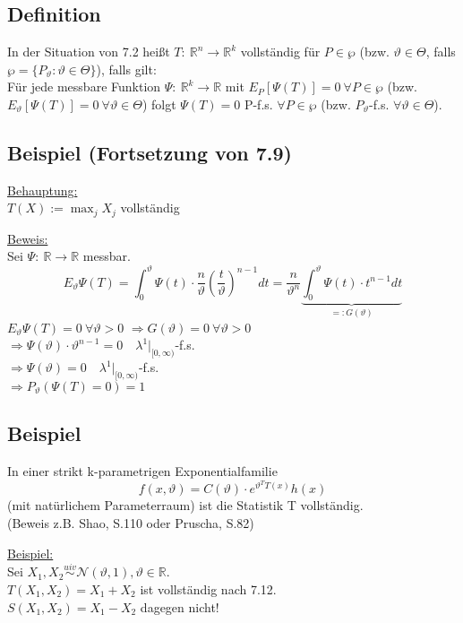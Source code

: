\documentclass[a4paper,11pt,twoside,titlepage]{article}
\newcommand{\R}{{\mathbb R}}
\newcommand\NN{ \mathcal{N} } %
\newcommand{\uiv}{\ensuremath{\stackrel{uiv}{\sim}}}
\begin{document}
\subsection{Definition}
In der Situation von 7.2 heißt $T:\ \R^n\to\R^k$ vollständig für $P\in\wp$ (bzw. $\vartheta\in\Theta$, falls $\wp=\{P_\vartheta:\vartheta\in\Theta\}$), falls gilt:\\
Für jede messbare Funktion $\Psi:\ \R^k\to\R$ mit $E_P[\Psi(T)]=0\ \forall P\in\wp$ (bzw. $E_\vartheta[\Psi(T)]=0\ \forall \vartheta\in\Theta$) folgt $\Psi(T)=0$ P-f.s. $\forall P\in\wp$ (bzw. $P_\vartheta$-f.s. $\forall\vartheta\in\Theta$).

\subsection{Beispiel \textnormal{(Fortsetzung von 7.9)}}
\underline{Behauptung:}\\
$T(X):=\max_j X_j$ vollständig

\underline{Beweis:}\\
Sei $\Psi:\ \R\to\R$ messbar.
\[E_\vartheta\Psi(T)=\int_0^\vartheta\Psi(t)\cdot\frac{n}{\vartheta}\left(\frac{t}{\vartheta}\right)^{n-1}dt=\frac{n}{\vartheta^n}\underbrace{\int_0^\vartheta\Psi(t)\cdot t^{n-1}dt}_{=:G(\vartheta)}\]
$E_\vartheta\Psi(T)=0\ \forall\vartheta>0$ $\Rightarrow G(\vartheta)=0\ \forall\vartheta>0$\\
$\Rightarrow \Psi(\vartheta)\cdot\vartheta^{n-1}=0\quad \lambda^1|_{[0,\infty)}$-f.s.\\
$\Rightarrow \Psi(\vartheta)=0\quad \lambda^1|_{[0,\infty)}$-f.s.\\
$\Rightarrow P_\vartheta(\Psi(T)=0)=1$

\subsection{Beispiel}
In einer strikt k-parametrigen Exponentialfamilie
\[f(x,\vartheta)=C(\vartheta)\cdot e^{\vartheta^T T(x)}h(x)\]
(mit natürlichem Parameterraum) ist die Statistik T vollständig.\\
(Beweis z.B. Shao, S.110 oder Pruscha, S.82)

\underline{Beispiel:}\\
Sei $X_1,X_2\uiv\NN(\vartheta,1),\vartheta\in\R$.\\
$T(X_1,X_2)=X_1+X_2$ ist vollständig nach 7.12.\\
$S(X_1,X_2)=X_1-X_2$ dagegen nicht!
\end{document}
